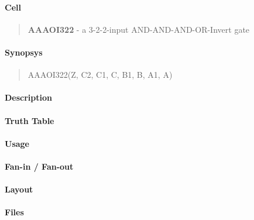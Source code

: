 \label{AAAOI322}
\paragraph{Cell}
\begin{quote}
    \textbf{AAAOI322} - a 3-2-2-input AND-AND-AND-OR-Invert gate
\end{quote}

\paragraph{Synopsys}
\begin{quote}
    AAAOI322(Z, C2, C1, C, B1, B, A1, A)
\end{quote}

\paragraph{Description}



\paragraph{Truth Table}


\paragraph{Usage}

\paragraph{Fan-in / Fan-out}

\paragraph{Layout}

\paragraph{Files}

